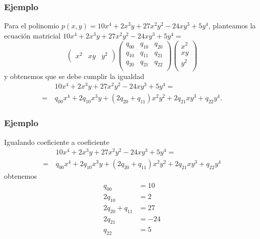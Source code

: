 \documentclass[aspectratio=169,12pt,spanish]{beamer}
\begin{document}


\begin{frame}


\frametitle{Ejemplo}

Para el polinomio $p(x,y) = 10x^4+2x^3y+27x^2y^2-24xy^3+5y^4$, planteamos la ecuación matricial
$10x^4+2x^3y+27x^2y^2-24xy^3+5y^4 = $
\[
\begin{pmatrix}
x^2 & xy & y^2
\end{pmatrix}
\begin{pmatrix}
q_{00} & q_{10} & q_{20} \\
q_{10} & q_{11} & q_{21} \\
q_{20} & q_{21} & q_{22} \\
\end{pmatrix}
\begin{pmatrix}
x^2 \\
xy \\
y^2 \\
\end{pmatrix}
\]
y obtenemos que se debe cumplir la igualdad
\begin{align*}
& 10x^4+2x^3y+27x^2y^2-24xy^3+5y^4 = \\
= \  & q_{00} x^4 + 2q_{10} x^3y + (2q_{20} + q_{11})x^2y^2 + 2q_{21}xy^3 + q_{22} y^4.
\end{align*}



\end{frame}





\begin{frame}


\frametitle{Ejemplo}

Igualando coeficiente a coeficiente 
\begin{align*}
& 10x^4+2x^3y+27x^2y^2-24xy^3+5y^4 = \\
= \  & q_{00} x^4 + 2q_{10} x^3y + (2q_{20} + q_{11})x^2y^2 + 2q_{21}xy^3 + q_{22} y^4
\end{align*}
obtenemos
\begin{align*}
q_{00} &= 10 \\
2q_{10} &= 2 \\
2q_{20} + q_{11} &= 27 \\
2q_{21} &= -24 \\
q_{22} &= 5
\end{align*}



\end{frame}
\end{document}
